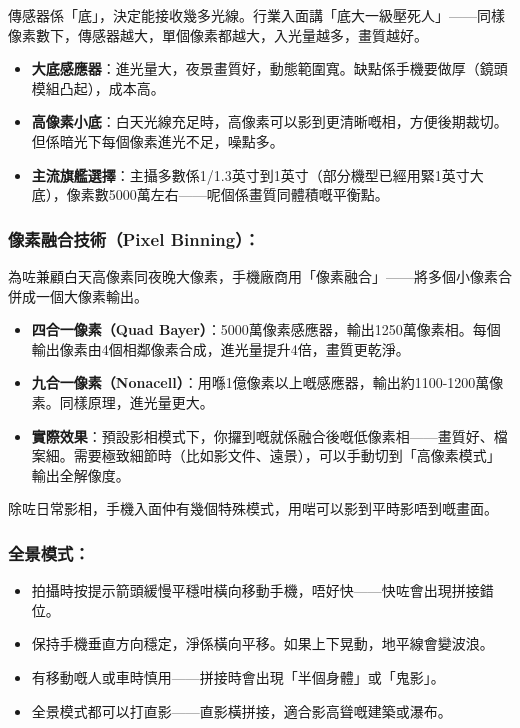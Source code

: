 傳感器係「底」，決定能接收幾多光線。行業入面講「底大一級壓死人」——同樣像素數下，傳感器越大，單個像素都越大，入光量越多，畫質越好。

\begin{itemize}
  \item \textbf{大底感應器}：進光量大，夜景畫質好，動態範圍寬。缺點係手機要做厚（鏡頭模組凸起），成本高。
  \item \textbf{高像素小底}：白天光線充足時，高像素可以影到更清晰嘅相，方便後期裁切。但係暗光下每個像素進光不足，噪點多。
  \item \textbf{主流旗艦選擇}：主攝多數係1/1.3英寸到1英寸（部分機型已經用緊1英寸大底），像素數5000萬左右——呢個係畫質同體積嘅平衡點。
\end{itemize}

\subsubsection*{像素融合技術（Pixel Binning）：}

為咗兼顧白天高像素同夜晚大像素，手機廠商用「像素融合」——將多個小像素合併成一個大像素輸出。

\begin{itemize}
  \item \textbf{四合一像素（Quad Bayer）}：5000萬像素感應器，輸出1250萬像素相。每個輸出像素由4個相鄰像素合成，進光量提升4倍，畫質更乾淨。
  \item \textbf{九合一像素（Nonacell）}：用喺1億像素以上嘅感應器，輸出約1100-1200萬像素。同樣原理，進光量更大。
  \item \textbf{實際效果}：預設影相模式下，你攞到嘅就係融合後嘅低像素相——畫質好、檔案細。需要極致細節時（比如影文件、遠景），可以手動切到「高像素模式」輸出全解像度。
\end{itemize}


除咗日常影相，手機入面仲有幾個特殊模式，用啱可以影到平時影唔到嘅畫面。

\subsubsection*{全景模式：}

\begin{itemize}
  \item 拍攝時按提示箭頭緩慢平穩咁橫向移動手機，唔好快——快咗會出現拼接錯位。
  \item 保持手機垂直方向穩定，淨係橫向平移。如果上下晃動，地平線會變波浪。
  \item 有移動嘅人或車時慎用——拼接時會出現「半個身體」或「鬼影」。
  \item 全景模式都可以打直影——直影橫拼接，適合影高聳嘅建築或瀑布。
\end{itemize}

